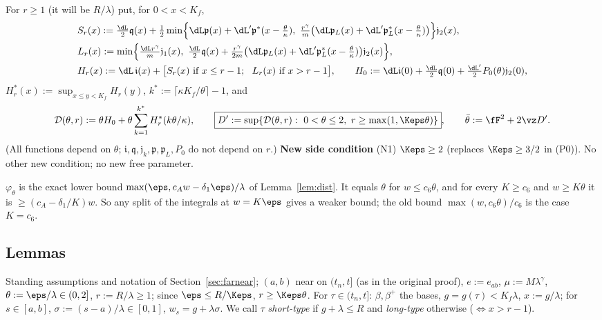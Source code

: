 For $r\ge1$ (it will be $R/\lambda$) put, for $0<x<K_f$,
\begin{align*}
&S_r(x):=\tfrac{\dL}2\mathfrak q(x)+\tfrac12\min\Bigl\{\dL\mathfrak p(x)+\dL'\mathfrak p^*(x-\tfrac\theta\kappa),\
 \tfrac{r^\gamma}{m}\bigl(\dL\mathfrak p_L(x)+\dL'\mathfrak p_L^*(x-\tfrac\theta\kappa)\bigr)\Bigr\}\mathfrak j_2(x),\\
&L_r(x):=\min\Bigl\{\tfrac{\dL r^\gamma}{m}\mathfrak j_1(x),\ \tfrac{\dL}2\mathfrak q(x)+\tfrac{r^\gamma}{2m}
 \bigl(\dL\mathfrak p_L(x)+\dL'\mathfrak p_L^*(x-\tfrac\theta\kappa)\bigr)\mathfrak j_2(x)\Bigr\},\\
&H_r(x):=\dL\,\mathfrak i(x)+\bigl[S_r(x)\ \text{if}\ x\le r-1;\ \ L_r(x)\ \text{if}\ x>r-1\bigr],\qquad
 H_0:=\dL\mathfrak i(0)+\tfrac{\dL}2\mathfrak q(0)+\tfrac{\dL'}2P_0(\theta)\mathfrak j_2(0),
\end{align*}
$H_r^*(x):=\sup_{x\le y<K_f}H_r(y)$, $k^*:=\lceil\kappa K_f/\theta\rceil-1$, and
\[
\mathcal D(\theta,r):=\theta H_0+\theta\sum_{k=1}^{k^*}H_r^*(k\theta/\kappa),\qquad
\boxed{D':=\sup\{\mathcal D(\theta,r):\ 0<\theta\le2,\ r\ge\max(1,\Keps\theta)\}},\qquad
\bar\theta:=\fF^2+2\vz D'.
\]
(All functions depend on $\theta$; $\mathfrak i,\mathfrak q,\mathfrak j_k,\mathfrak p,\mathfrak p_L,P_0$ do not depend on $r$.)
\textbf{New side condition} (N1) $\Keps\ge2$ (replaces $\Keps\ge3/2$ in (P0)). No other new condition; no new free parameter.

\begin{remark}
$\varphi_\theta$ is the exact lower bound $\max(\eps,c_A w-\delta_1\eps)/\lambda$ of Lemma~\ref{lem:dist}. It equals $\theta$ for
$w\le c_6\theta$, and for every $K\ge c_6$ and $w\ge K\theta$ it is $\ge(c_A-\delta_1/K)w$. So any split of the integrals at
$w=K\eps$ gives a weaker bound; the old bound $\max(w,c_6\theta)/c_6$ is the case $K=c_6$.
\end{remark}

\subsection*{Lemmas}
Standing assumptions and notation of Section~\ref{sec:farnear}; $(a,b)$ near on $(t_n,t]$ (as in the original proof),
$e:=e_{ab}$, $\mu:=M\lambda^\gamma$, $\theta:=\eps/\lambda\in(0,2]$, $r:=R/\lambda\ge1$; since $\eps\le R/\Keps$,
$r\ge\Keps\theta$. For $\tau\in(t_n,t]$: $\beta,\beta^+$ the bases, $g=g(\tau)<K_f\lambda$, $x:=g/\lambda$; for $s\in[a,b]$,
$\sigma:=(s-a)/\lambda\in[0,1]$, $w_s=g+\lambda\sigma$. We call $\tau$ \emph{short-type} if $g+\lambda\le R$ and
\emph{long-type} otherwise ($\Leftrightarrow x>r-1$).

